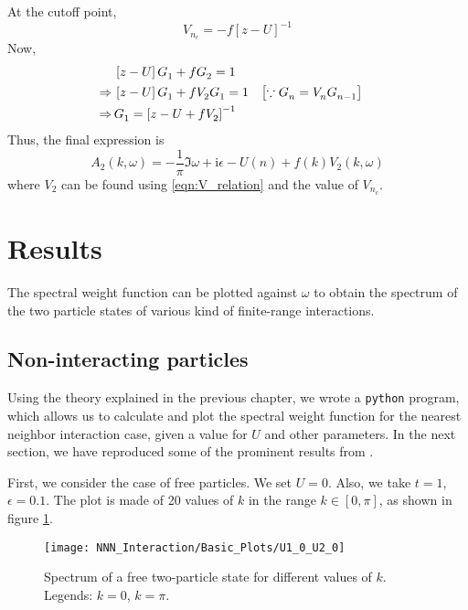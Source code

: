 \documentclass[a4paper, 11pt]{report}
\newcommand{\I}{\mathrm{i}}
\begin{document}
At the cutoff point,
\begin{displaymath}
V^{}_{n_c} = -f \left[ z - U \right]^{-1} 
\end{displaymath}
Now,
\begin{displaymath}
\begin{split}
&\left[ z - U \right]G^{}_1 + f G^{}_{2} = 1  \\
\Rightarrow\, & \left[ z - U \right]G^{}_1 + f V^{}_{2} G^{}_{1} = 1  \qq{$ \left[ \because G^{}_{n} = V^{}_{n} G^{}_{n-1} \right]  $} \\
\Rightarrow\, & G^{}_1 = \left[ z - U + f V^{}_{2} \right] ^{-1}
\end{split}
\end{displaymath}
Thus, the final expression is
\begin{equation}
A^{}_{2} \left( k, \omega \right) = -\frac{1}{\pi} \Im{\omega + \I \epsilon - U\left(n\right) + f\left(k\right) V^{}_{2} \left(k, \omega\right)}
\end{equation}
where $V^{}_{2}$ can be found using \eqref{eqn:V_relation} and the value of $V^{}_{n_c}$.

\section{Results}\label{ssec:Results}
The spectral weight function can be plotted against $\omega$ to obtain the spectrum of the two particle states of various kind of finite-range interactions.

\subsection{Non-interacting particles}
Using the theory explained in the previous chapter, we wrote a \texttt{python} program, which allows us to calculate and plot the spectral weight function for the nearest neighbor interaction case, given a value for $U$ and other parameters. In the next section, we have reproduced some of the prominent results from \cite{bib:mb_paper}.

First, we consider the case of free particles. We set $U = 0$. Also, we take $t=1$, $\epsilon = 0.1$. The plot is made of 20 values of $k$ in the range $k \in \left[0,\pi\right]$, as shown in figure \ref{fig:u10u20}.

\begin{figure}[h!]
\centering
\texttt{[image: NNN\_Interaction/Basic\_Plots/U1\_0\_U2\_0]}
\caption{Spectrum of a free two-particle state for different values of $k$. Legends: {\color{blue} $k = 0$}, {\color{red} $k = \pi$}.}
\label{fig:u10u20}
\end{figure}
\end{document}
